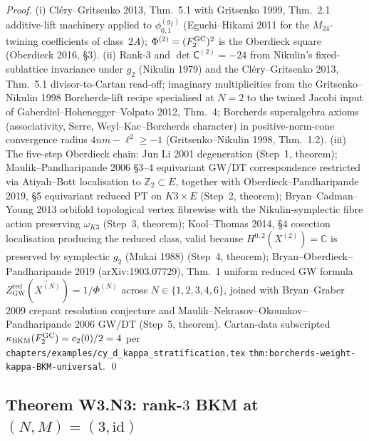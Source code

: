 \emph{Proof.} (i) Cl\'ery--Gritsenko 2013, Thm.~5.1 with Gritsenko 1999,
Thm.~2.1 additive-lift machinery applied to $\phi^{(g_2)}_{0,1}$
(Eguchi--Hikami 2011 for the $M_{24}$-twining coefficients of class~$2A$);
$\Phi^{(2)} = (F^{\mathrm{GC}}_2)^2$ is the Oberdieck square (Oberdieck 2016, \S 3).
(ii) Rank-$3$ and $\det \mathsf{C}^{(2)} = -24$ from Nikulin's
fixed-sublattice invariance under $g_2$ (Nikulin 1979) and the
Cl\'ery--Gritsenko 2013, Thm.~5.1 divisor-to-Cartan read-off; imaginary
multiplicities from the Gritsenko--Nikulin 1998 Borcherds-lift recipe
specialised at $N = 2$ to the twined Jacobi input of
Gaberdiel--Hohenegger--Volpato 2012, Thm.~4; Borcherds superalgebra
axioms (associativity, Serre, Weyl--Kac--Borcherds character) in
positive-norm-cone convergence radius $4nm - \ell^2 \ge -1$
(Gritsenko--Nikulin 1998, Thm.~1.2). (iii) The five-step Oberdieck
chain: Jun Li 2001 degeneration (Step~1, theorem); Maulik--Pandharipande
2006 \S 3--4 equivariant GW/DT correspondence restricted via
Atiyah--Bott localisation to $\mathbb{Z}_2 \subset E$, together with
Oberdieck--Pandharipande 2019, \S 5 equivariant reduced PT on
$K3 \times E$ (Step~2, theorem); Bryan--Cadman--Young 2013 orbifold
topological vertex fibrewise with the Nikulin-symplectic fibre action
preserving $\omega_{K3}$ (Step~3, theorem); Kool--Thomas 2014, \S 4
cosection localisation producing the reduced class, valid because
$H^{0,2}(X^{(2)}) = \mathbb{C}$ is preserved by symplectic $g_2$
(Mukai 1988) (Step~4, theorem); Bryan--Oberdieck--Pandharipande 2019
(arXiv:1903.07729), Thm.~1 uniform reduced GW formula
$Z^{\mathrm{red}}_{\mathrm{GW}}(\widetilde{X^{(N)}}) = 1/\Phi^{(N)}$
across $N \in \{1, 2, 3, 4, 6\}$, joined with Bryan--Graber 2009
crepant resolution conjecture and Maulik--Nekrasov--Okounkov--Pandharipande
2006 GW/DT (Step~5, theorem). Cartan-data subscripted
$\kappa_{\mathrm{BKM}}(F^{\mathrm{GC}}_2) = c_2(0)/2 = 4$ per
\texttt{chapters/examples/cy\_d\_kappa\_stratification.tex}
\texttt{thm:borcherds-weight-kappa-BKM-universal}. \qed

\subsection*{Theorem W3.N3: rank-$3$ BKM at $(N, M) = (3, \mathrm{id})$}
\label{thm:wave11-w3-rank3-BKM-N3-id}


